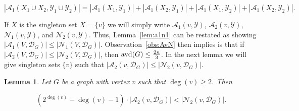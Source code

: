 \documentclass[11pt]{article}
\newtheorem{lemma}[definition]{Lemma}
\newcommand{\avd}{\text{\rm{avd}}}
\newcommand{\A}[3][\mathcal{D}_G]{\mathcal{A}_{#3}(#2, #1)}
\newcommand{\N}[3][\mathcal{D}_G]{\mathcal{N}_{#3}(#2, #1)}
\begin{document}
$$|\A[\mathcal{Y}_1 \cup \mathcal{Y}_2]{X_1 \cup X_2}{1}| = |\A[\mathcal{Y}_1]{X_1}{1}| + |\A[\mathcal{Y}_1]{X_2}{1}|  + |\A[\mathcal{Y}_2]{X_1}{1}|  + |\A[\mathcal{Y}_2]{X_2}{1}|.$$

\noindent If $X$ is the singleton set $X=\{v\}$ we will simply write $\A[\mathcal{Y}]{v}{1}$, $\A[\mathcal{Y}]{v}{2}$, $\N[\mathcal{Y}]{v}{1}$, and $\N[\mathcal{Y}]{v}{2}$. Thus, Lemma~\ref{lem:a1n1} can be restated as showing $|\A{V}{1}| \leq |\N{V}{1}|$. Observation~\ref{obs:AvN} then implies is that if $|\A{V}{2}| \leq |\N{V}{2}|$, then $\avd(G) \leq \frac{2n}{3}$. In the next lemma we will give singleton sets $\{v\}$ such that $|\A{v}{2}| \leq |\N{v}{2}|$. 

\begin{lemma}
\label{lem:deg2}
Let $G$ be a graph with vertex $v$ such that $\deg(v) \geq 2$. Then 

$$(2^{\deg(v)}-\deg(v)-1) \cdot |\A{v}{2}| < |\N{v}{2}|.$$


\end{lemma}
\end{document}
